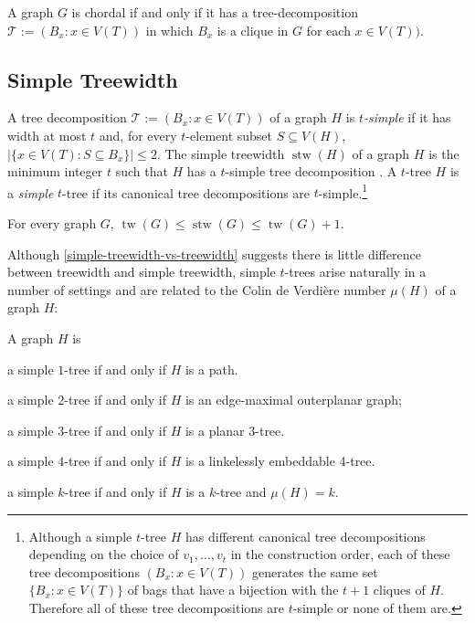 \documentclass[kpfonts]{patmorin}
\DeclareMathOperator{\tw}{tw}
\DeclareMathOperator{\stw}{stw}
\theoremstyle{named}
\begin{document}
\begin{lem}
\label{TreeDecompositionChordal}
    A graph $G$ is chordal if and only if it has a tree-decomposition $\mathcal{T}:=(B_x:x\in V(T))$ in which $B_x$ is a clique in $G$ for each $x\in V(T))$.
\end{lem}


\subsection{Simple Treewidth}
\label{simple-treewidth}

A tree decomposition $\mathcal{T}:=(B_x:x\in V(T))$ of a graph $H$ is \emph{$t$-simple} if it has width at most $t$ and, for every $t$-element subset $S\subseteq V(H)$, $|\{x\in V(T):S\subseteq B_x\}|\le 2$.  The simple treewidth $\stw(H)$ of a graph $H$ is the minimum integer $t$ such that $H$ has a $t$-simple tree decomposition \cite{knauer.ueckerdt:simple}.  A $t$-tree $H$ is a \emph{simple} $t$-tree if its canonical tree decompositions are $t$-simple.\footnote{Although a simple $t$-tree $H$ has different canonical tree decompositions depending on the choice of $v_1,\ldots,v_t$ in the construction order, each of these tree decompositions $(B_x:x\in V(T))$ generates the same set $\{B_x:x\in V(T)\}$ of bags that have a bijection with the $t+1$ cliques of $H$.  Therefore all of these tree decompositions are $t$-simple or none of them are.}


\begin{lem}\label{simple-treewidth-vs-treewidth}
    For every graph $G$, $\tw(G)\le \stw(G)\le \tw(G)+1$.
\end{lem}

Although \cref{simple-treewidth-vs-treewidth} suggests there is little difference between treewidth and simple treewidth, simple $t$-trees arise naturally in a number of settings and are related to the Colin de Verdière number $\mu(H)$ of a graph $H$:

\begin{lem}\label{simple-small-cases}
    A graph $H$ is
    \begin{compactenum}[(i)]
        \item a simple $1$-tree if and only if $H$ is a path.
        \item a simple $2$-tree if and only if $H$ is an edge-maximal outerplanar graph;
        \item a simple $3$-tree if and only if $H$ is a planar 3-tree.
        \item a simple $4$-tree if and only if $H$ is a linkelessly embeddable 4-tree.
        \item a simple $k$-tree if and only if $H$ is a $k$-tree and $\mu(H)=k$.
    \end{compactenum}
\end{lem}
\end{document}
